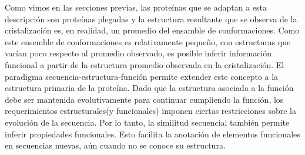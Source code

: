 Como vimos en las secciones previas, las proteínas que se adaptan a esta descripción son proteínas plegadas y la estructura resultante que se observa de la cristalización es, en realidad, un promedio del ensamble de conformaciones.
Como este ensemble de conformaciones es relativamente pequeño, con estructuras que varían poco respecto al promedio observado, es posible inferir información funcional a partir de la estructura promedio observada en la cristalización.
El paradigma secuencia-estructura-función permite extender este concepto a la estructura primaria de la proteína.
Dado que la estructura asociada a la función debe ser mantenida evolutivamente para continuar cumpliendo la función, los requerimientos estructurales(y funcionales) imponen ciertas restricciones sobre la evolución de la secuencia.
Por lo tanto, la similitud secuencial también permite inferir propiedades funcionales. Esto facilita la anotación de elementos funcionales en secuencias nuevas, aún cuando no se conoce su estructura.







